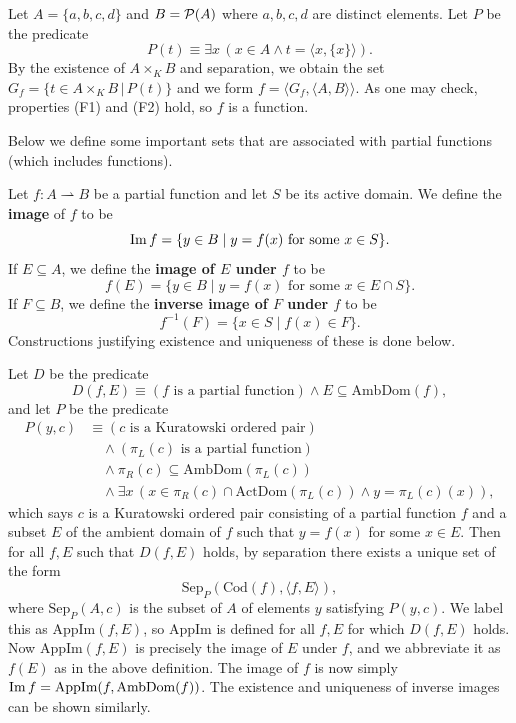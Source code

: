 \begin{example}\label{ch1ex_fn_set}
	Let $A = \{a, b, c, d\}$ and $B = \mathcal{P}(A)$ where $a, b, c, d$ are distinct elements. 
	Let $P$ be the predicate
	\[ P(t)\equiv \exists x\, (x\in A\land t = \langle x, \{x\}\rangle). \]
	By the existence of $A\times_{K} B$ and separation, we obtain the set $G_{f} = \{ t\in A\times_{K} B \,|\, P(t) \}$ and we form $f = \langle G_{f}, \langle A, B\rangle\rangle$. 
	As one may check, properties (F1) and (F2) hold, so $f$ is a function. 
\end{example}

Below we define some important sets that are associated with partial functions (which includes functions).

\begin{definition} 
	Let $f:A\rightharpoonup B$ be a partial function and let $S$ be its active domain.
	We define the \textbf{image} of $f$ to be 
	\[ \operatorname{Im} f = \{ y\in B \;|\; y = f(x) \text{ for some } x\in S \}. \]
	If $E\subseteq A$, we define the \textbf{image of $E$ under $f$} to be
	\[ f(E) = \{ y\in B \;|\; y = f(x) \text{ for some } x\in E\cap S \}. \]
	If $F\subseteq B$, we define the \textbf{inverse image of $F$ under $f$} to be
	\[ f^{-1}(F) = \{ x\in S \;|\; f(x)\in F \}. \]
	Constructions justifying existence and uniqueness of these is done below. 
\end{definition}

Let $D$ be the predicate
\[ D(f, E)\equiv (f\text{ is a partial function})\land E\subseteq\textrm{AmbDom}(f), \]
and let $P$ be the predicate
\begin{align*}
	P(y, c) &\equiv (c\text{ is a Kuratowski ordered pair}) \\
	&\quad\land (\pi_{L}(c)\text{ is a partial function}) \\
	&\quad\land \pi_{R}(c)\subseteq\textrm{AmbDom}(\pi_{L}(c)) \\
	&\quad\land \exists x\, (x\in\pi_{R}(c)\cap\textrm{ActDom}(\pi_{L}(c))\land y = \pi_{L}(c)(x)),
\end{align*}
which says $c$ is a Kuratowski ordered pair consisting of a partial function $f$ and a subset $E$ of the ambient domain of $f$ such that $y = f(x)$ for some $x\in E$.
Then for all $f, E$ such that $D(f, E)$ holds, by separation there exists a unique set of the form
\[ \textrm{Sep}_{P}(\textrm{Cod}(f), \langle f, E\rangle), \]
where $\textrm{Sep}_{P}(A, c)$ is the subset of $A$ of elements $y$ satisfying $P(y, c)$.
We label this as $\textrm{AppIm}(f, E)$, so $\textrm{AppIm}$ is defined for all $f, E$ for which $D(f, E)$ holds. 
Now $\textrm{AppIm}(f, E)$ is precisely the image of $E$ under $f$, and we abbreviate it as $f(E)$ as in the above definition. 
The image of $f$ is now simply $\operatorname{Im} f = \textrm{AppIm}(f, \textrm{AmbDom}(f))$. 
The existence and uniqueness of inverse images can be shown similarly. 

